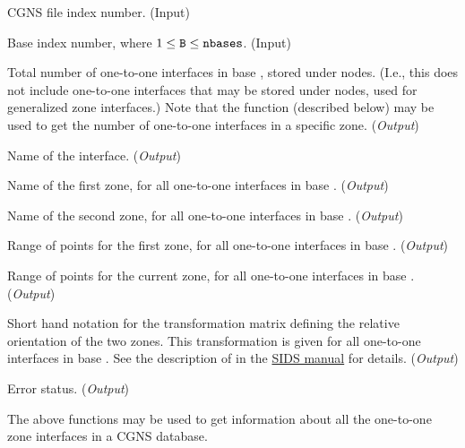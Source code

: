 \begin{Ventryi}{}\raggedright
\item [\fort{fn}]
      CGNS file index number.
      (\textcolor{input}{Input})
\item [\fort{B}]
      Base index number, where $1 \leq \text{{\normalfont\texttt{B}}} \leq \text{{\normalfont\texttt{nbases}}}$.
      (\textcolor{input}{Input})
\item [\fort{n1to1\_global}]
      Total number of one-to-one interfaces in base ,
      stored under  nodes.
      (I.e., this does not include one-to-one interfaces that may be
      stored under  nodes, used for
      generalized zone interfaces.)
      Note that the function  (described below) may be
      used to get the number of one-to-one interfaces in a specific
      zone.
      (\textcolor{output}{\textit{Output}})
\item [\fort{connectname}]
      Name of the interface.
      (\textcolor{output}{\textit{Output}})
\item [\fort{zonename}]
      Name of the first zone, for all one-to-one interfaces in base
      .
      (\textcolor{output}{\textit{Output}})
\item [\fort{donorname}]
      Name of the second zone, for all one-to-one interfaces in base
      .
      (\textcolor{output}{\textit{Output}})
\item [\fort{range}]
      Range of points for the first zone, for all one-to-one interfaces
      in base .
      (\textcolor{output}{\textit{Output}})
\item [\fort{donor\_range}]
      Range of points for the current zone, for all one-to-one interfaces
      in base .
      (\textcolor{output}{\textit{Output}})
\item [\fort{transform}]
      Short hand notation for the transformation matrix defining the
      relative orientation of the two zones.
      This transformation is given for all one-to-one interfaces in
      base .
      See the description of  in the
      \href{../sids/sids.pdf}{SIDS manual} for details.
      (\textcolor{output}{\textit{Output}})
\item [\fort{ier}]
      Error status.
      (\textcolor{output}{\textit{Output}})
\end{Ventryi}

The above functions may be used to get information about all the
one-to-one zone interfaces in a CGNS database.

